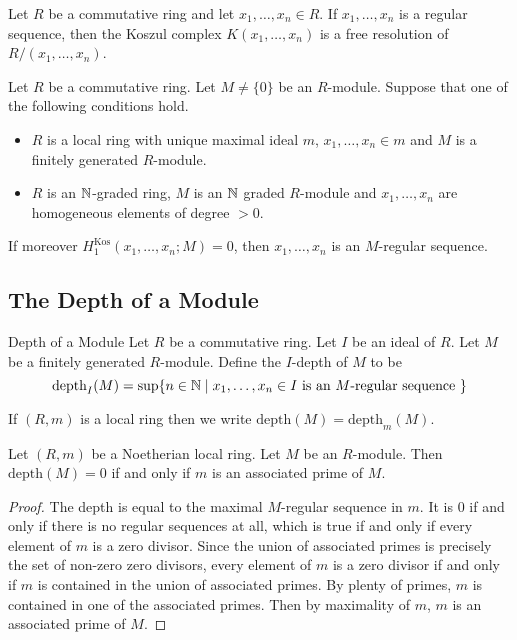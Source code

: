 \documentclass[a4paper]{article}
\begin{document}
\begin{crl}{}{} Let $R$ be a commutative ring and let $x_1,\dots,x_n\in R$. If $x_1,\dots,x_n$ is a regular sequence, then the Koszul complex $K(x_1,\dots,x_n)$ is a free resolution of $R/(x_1,\dots,x_n)$. 
\end{crl}

\begin{prp}{}{} Let $R$ be a commutative ring. Let $M\neq\{0\}$ be an $R$-module. Suppose that one of the following conditions hold. 
\begin{itemize}
\item $R$ is a local ring with unique maximal ideal $m$, $x_1,\dots,x_n\in m$ and $M$ is a finitely generated $R$-module. 
\item $R$ is an $\mathbb{N}$-graded ring, $M$ is an $\mathbb{N}$ graded $R$-module and $x_1,\dots,x_n$ are homogeneous elements of degree $>0$. 
\end{itemize}
If moreover $H_1^\text{Kos}(x_1,\dots,x_n;M)=0$, then $x_1,\dots,x_n$ is an $M$-regular sequence. 
\end{prp}

\subsection{The Depth of a Module}
\begin{defn}{Depth of a Module}{} Let $R$ be a commutative ring. Let $I$ be an ideal of $R$. Let $M$ be a finitely generated $R$-module. Define the $I$-depth of $M$ to be $$\text{depth}_I(M)=\sup\{n\in\mathbb{N}\;|\;x_1,\dots,x_n\in I\text{ is an }M\text{-regular sequence }\}$$
\end{defn}

If $(R,m)$ is a local ring then we write $\text{depth}(M)=\text{depth}_m(M)$. 

\begin{lmm}{}{} Let $(R,m)$ be a Noetherian local ring. Let $M$ be an $R$-module. Then $\text{depth}(M)=0$ if and only if $m$ is an associated prime of $M$. 
\begin{proof}
The depth is equal to the maximal $M$-regular sequence in $m$. It is $0$ if and only if there is no regular sequences at all, which is true if and only if every element of $m$ is a zero divisor. Since the union of associated primes is precisely the set of non-zero zero divisors, every element of $m$ is a zero divisor if and only if $m$ is contained in the union of associated primes. By plenty of primes, $m$ is contained in one of the associated primes. Then by maximality of $m$, $m$ is an associated prime of $M$. 
\end{proof}
\end{lmm}
\end{document}
